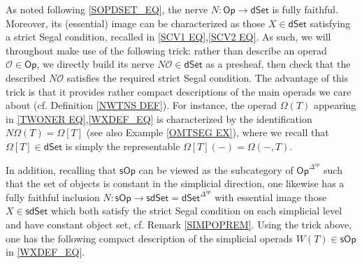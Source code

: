 \documentclass{hha}
\theoremstyle{definition} %
\newcommand{\Op}{\mathsf{Op}}
\newcommand{\sOp}{\mathsf{sOp}}
\renewcommand{\O}{\mathcal O}
\begin{document}
As noted following \eqref{SOPDSET_EQ},
the nerve $N\colon \mathsf{Op} \to \mathsf{dSet}$
is fully faithful.
Moreover, its (essential) image
can be characterized as those 
$X \in \mathsf{dSet}$ satisfying a strict Segal condition,
recalled in \eqref{SCV1 EQ},\eqref{SCV2 EQ}.
As such, we will throughout make use of the following trick:
rather than describe an operad $\O \in \mathsf{Op}$,
we directly build its nerve 
$N\O \in \mathsf{dSet}$ as a presheaf,
then check that the described $N\O$ satisfies the required strict Segal condition.
The advantage of this trick is that it provides rather compact descriptions of the main operads we care about 
(cf. Definition \ref{NWTNS DEF}).
For instance, 
the operad $\Omega(T)$ appearing in 
\eqref{TWONER EQ},\eqref{WXDEF_EQ}
is characterized by the identification $N\Omega(T) =\Omega[T]$
(see also Example \ref{OMTSEG EX}), 
where we recall that $\Omega[T]\in \mathsf{dSet}$
is simply the representable $\Omega[T](-) = \Omega(-,T)$.


In addition, recalling that $\sOp$ can be viewed as the subcategory
of $\Op^{\Delta^{op}}$ such that the set of objects is constant in the simplicial direction,
one likewise has a fully faithful inclusion
$N\colon \sOp \to \mathsf{sdSet} = \mathsf{dSet}^{\Delta^{op}}$
with essential image those
$X \in \mathsf{sdSet}$
which both satisfy the strict Segal condition on each simplicial level and have constant object set, 
cf. Remark \ref{SIMPOPREM}.
Using the trick above,
one has the following compact description
of the simplicial operads $W(T) \in \sOp$ in \eqref{WXDEF_EQ}.
\end{document}
